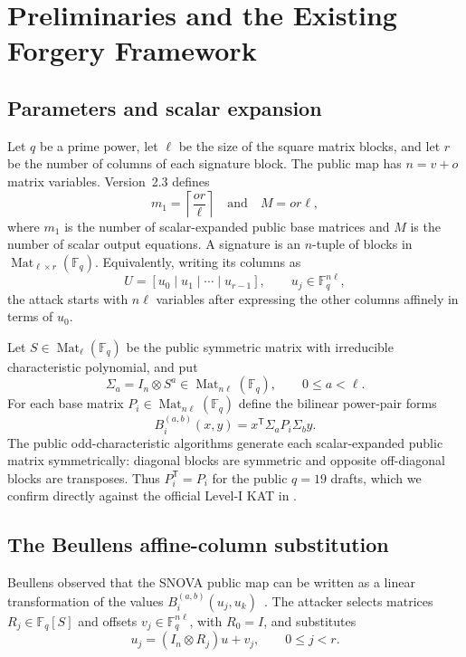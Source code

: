 \documentclass[11pt]{article}
\newcommand{\F}{\mathbb F}
\newcommand{\Mat}{\operatorname{Mat}}
\newcommand{\transpose}{\mathsf T}
\newcommand{\SNOVA}{\textsf{SNOVA}}
\begin{document}
\section{Preliminaries and the Existing Forgery Framework}\label{sec:prelim}

\subsection{Parameters and scalar expansion}

Let $q$ be a prime power, let $\ell$ be the size of the square matrix blocks, and let $r$ be the number of columns of each signature block.  The public map has $n=v+o$ matrix variables.  Version~2.3 defines
\[
 m_1=\left\lceil\frac{or}{\ell}\right\rceil
 \quad\text{and}\quad
 M=or\ell,
\]
where $m_1$ is the number of scalar-expanded public base matrices and $M$ is the number of scalar output equations.  A signature is an $n$-tuple of blocks in $\Mat_{\ell\times r}(\F_q)$.  Equivalently, writing its columns as
\[
 U=[u_0\mid u_1\mid\cdots\mid u_{r-1}],
 \qquad u_j\in\F_q^{n\ell},
\]
the attack starts with $n\ell$ variables after expressing the other columns affinely in terms of $u_0$.

Let $S\in\Mat_{\ell}(\F_q)$ be the public symmetric matrix with irreducible characteristic polynomial, and put
\[
 \Sigma_a=I_n\otimes S^a\in\Mat_{n\ell}(\F_q),
 \qquad 0\le a<\ell.
\]
For each base matrix $P_i\in\Mat_{n\ell}(\F_q)$ define the bilinear power-pair forms
\begin{equation}\label{eq:B}
 B_i^{(a,b)}(x,y)=x^\transpose\Sigma_aP_i\Sigma_b y.
\end{equation}
The public odd-characteristic algorithms generate each scalar-expanded public matrix symmetrically: diagonal blocks are symmetric and opposite off-diagonal blocks are transposes.  Thus $P_i^\transpose=P_i$ for the public $q=19$ drafts, which we confirm directly against the official Level-I KAT in .

\subsection{The Beullens affine-column substitution}

Beullens observed that the \SNOVA{} public map can be written as a linear transformation of the values $B_i^{(a,b)}(u_j,u_k)$~\cite{Beullens2024SNOVA}.  The attacker selects matrices $R_j\in\F_q[S]$ and offsets $v_j\in\F_q^{n\ell}$, with $R_0=I$, and substitutes
\begin{equation}\label{eq:relation}
 u_j=(I_n\otimes R_j)u+v_j,
 \qquad 0\le j<r.
\end{equation}
\end{document}
